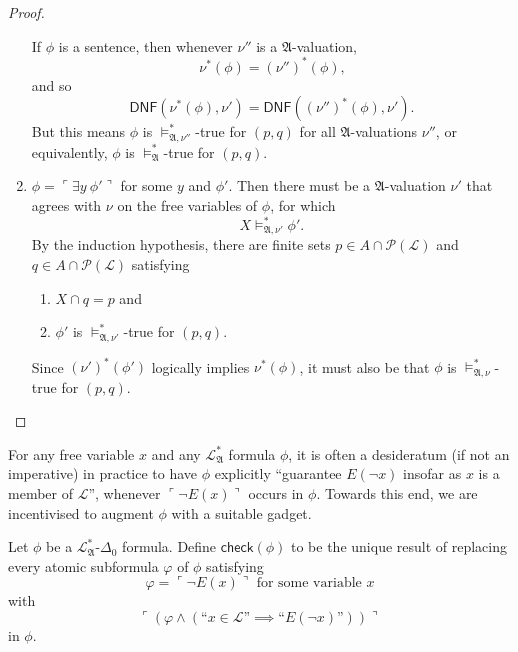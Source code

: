 \documentclass[12pt]{article}
\numberwithin{equation}{section}
\begin{document}
\begin{proof}
\begin{enumerate}[label=Case \arabic*:, leftmargin=50pt]
    If $\phi$ is a sentence, then whenever $\nu''$ is a $\mathfrak{A}$-valuation,
    \begin{equation*}
        \nu^*(\phi) = (\nu'')^*(\phi) \text{,}
    \end{equation*}
    and so
    \begin{equation*}
        \mathsf{DNF}(\nu^*(\phi), \nu') = \mathsf{DNF}((\nu'')^*(\phi), \nu') \text{.}
    \end{equation*}
    But this means $\phi$ is $\models^*_{\mathfrak{A}, \nu''}$-true for $(p, q)$ for all $\mathfrak{A}$-valuations $\nu''$, or equivalently, $\phi$ is $\models^*_{\mathfrak{A}}$-true for $(p, q)$.
    \item $\phi = \ulcorner \exists y \ \phi' \urcorner$ for some $y$ and $\phi'$. Then there must be a $\mathfrak{A}$-valuation $\nu'$ that agrees with $\nu$ on the free variables of $\phi$, for which $$X \models^{*}_{\mathfrak{A}, \nu'} \phi'.$$ By the induction hypothesis, there are finite sets $p \in A \cap \mathcal{P}(\mathcal{L})$ and $q \in A \cap \mathcal{P}(\mathcal{L})$ satisfying 
    \begin{enumerate}[label=(\alph*)]
        \item $X \cap q = p$ and
        \item $\phi'$ is $\models^*_{\mathfrak{A}, \nu'}$-true for $(p, q)$. 
    \end{enumerate}
    Since $(\nu')^*(\phi')$ logically implies $\nu^*(\phi)$, it must also be that $\phi$ is $\models^{*}_{\mathfrak{A}, \nu}$-true for $(p, q)$. \qedhere
\end{enumerate}
\end{proof}

For any free variable $x$ and any $\mathcal{L}^{*}_{\mathfrak{A}}$ formula $\phi$, it is often a desideratum (if not an imperative) in practice to have $\phi$ explicitly ``guarantee $E(\neg x)$ insofar as $x$ is a member of $\mathcal{L}$'', whenever $\ulcorner \neg E(x) \urcorner$ occurs in $\phi$. Towards this end, we are incentivised to augment $\phi$ with a suitable gadget.

\begin{defi}\label{check}
Let $\phi$ be a $\mathcal{L}^{*}_{\mathfrak{A}}$-$\Delta_0$ formula. Define $\mathsf{check}(\phi)$ to be the unique result of replacing every atomic subformula $\varphi$ of $\phi$ satisfying
\begin{equation*}
    \varphi = \ulcorner \neg E(x) \urcorner \text{ for some variable } x 
\end{equation*}
with 
\begin{equation*}
    \ulcorner (\varphi \wedge (\text{``} x \in \mathcal{L} \text{''} \implies \text{``} E(\neg x) \text{''})) \urcorner
\end{equation*}
in $\phi$.
\end{defi}
\end{document}
